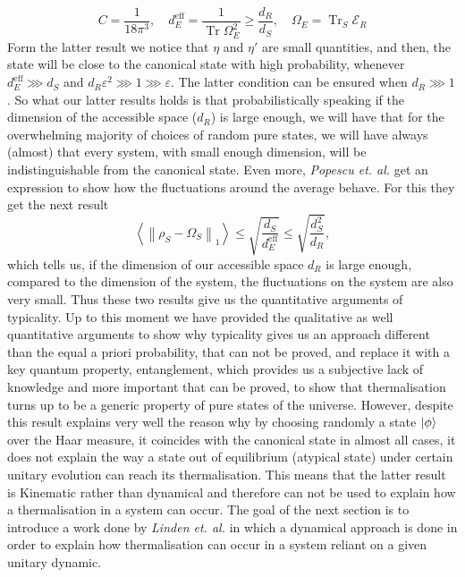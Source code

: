 \begin{equation}
C=\frac{1}{18 \pi^{3}}, \quad d_{E}^{\mathrm{eff}}=\frac{1}{\operatorname{Tr} \Omega_{E}^{2}}\geq \frac{d_R}{d_S}, \quad \Omega_{E}=\operatorname{Tr}_{S} \mathcal{E}_{R}
\label{CH1:Typicality_result_1_2}
\end{equation}
Form the latter result we notice that $\eta$ and $\eta'$ are small quantities, and then, the state will be close to the canonical state with high probability, whenever $d^{\mathrm{eff}}_E\ggg d_S$ and $d_R\varepsilon^2\ggg 1 \ggg \varepsilon$. The latter condition can be ensured when $d_R\ggg 1$.
\newline
So what our latter results holds is that probabilistically speaking if the dimension of the accessible space ($d_R$) is large enough, we will have that for the overwhelming majority of choices of random pure states, we will have always (almost) that every system, with small enough dimension, will be indistinguishable from the canonical state. Even more, \textit{Popescu et. al.} get an expression to show how the fluctuations around the average behave. For this they get the next result
\newline
\begin{equation}
\left\langle\left\|\rho_{S}-\Omega_{S}\right\|_{1}\right\rangle \leq \sqrt{\frac{d_S}{d_E^{\mathrm{eff}}}}\leq\sqrt{\frac{d_{S}^{2}}{d_{R}}},
\label{CH1:Typicality_result_2}
\end{equation}
which tells us, if the dimension of our accessible space $d_R$ is large enough, compared to the dimension of the system, the fluctuations on the system are also very small. Thus these two results give us the quantitative arguments of typicality.
\newline
Up to this moment we have provided the qualitative as well quantitative arguments to show why typicality gives us an approach different than the equal a priori probability, that can not be proved, and replace it with a key quantum property, entanglement, which provides us a subjective lack of knowledge and more important that can be proved, to show that thermalisation turns up to be a generic property of pure states of the universe. However, despite this result explains very well the reason why by choosing randomly a state $\mathinner{|{\phi}\rangle}$ over the Haar measure, it coincides with the canonical state in almost all cases, it does not explain the way a state out of equilibrium (atypical state) under certain unitary evolution can reach its thermalisation. This means that the latter result is Kinematic rather than dynamical and therefore can not be used to explain how a thermalisation in a system can occur. The goal of the next section is to introduce a work done by \textit{Linden et. al.} \cite{linden_quantum_2009} in which a dynamical approach is done in order to explain how thermalisation can occur in a system reliant on a given unitary dynamic.

